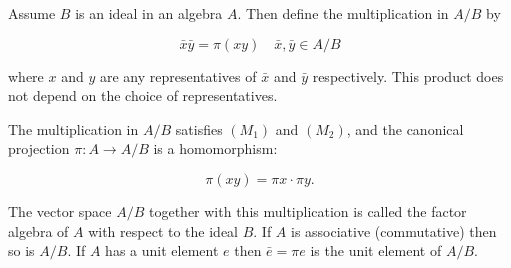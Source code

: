 Assume $B$ is an ideal in an algebra $A$. Then define the multiplication in $A/B$ by

$$\bar{x}\bar{y} = \pi(xy) \quad \bar{x}, \bar{y} \in A/B$$

where $x$ and $y$ are any representatives of $\bar{x}$ and $\bar{y}$ respectively. This product does not depend on the choice of representatives.

The multiplication in $A/B$ satisfies $(M_1)$ and $(M_2)$, and the canonical projection $\pi: A \to A/B$ is a homomorphism:

$$\pi(xy) = \pi x \cdot \pi y.$$

The vector space $A/B$ together with this multiplication is called the factor algebra of $A$ with respect to the ideal $B$. If $A$ is associative (commutative) then so is $A/B$. If $A$ has a unit element $e$ then $\bar{e} = \pi e$ is the unit element of $A/B$.
